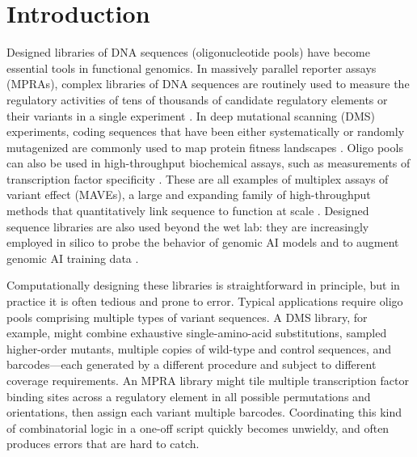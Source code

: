 \documentclass[twoside]{kinneylab_preprintstyle}
\begin{document}
\maketitle

\section*{Introduction}

Designed libraries of DNA sequences (oligonucleotide pools) have become essential tools in functional genomics. In massively parallel reporter assays (MPRAs), complex libraries of DNA sequences are routinely used to measure the regulatory activities of tens of thousands of candidate regulatory elements or their variants in a single experiment \citep{Patwardhan2009cw, Kinney2010tn, Melnikov2012dw, Kwasnieski2012hu, Sharon2012io, Mogno2013cf, Levo2014hl, Inoue2015cs, Vvedenskaya2015ih, Urtecho2018hu, Klein2020, Romero2023, LaFleur2024aa}. In deep mutational scanning (DMS) experiments, coding sequences that have been either systematically or randomly mutagenized are commonly used to map protein fitness landscapes \citep{Fowler2010gt, Hietpas2011bp, Fowler2014gq, Olson2014iq, Adams2016dka, Findlay2018kd, Starr2020aa}. Oligo pools can also be used in high-throughput biochemical assays, such as measurements of transcription factor specificity \citep{Berger2006wp, Maerkl2007tv, Noyes2008vr, Gordan2013, Le2018cr, Shen2018ip, Khetan2025_paditseq}. These are all examples of multiplex assays of variant effect (MAVEs), a large and expanding family of high-throughput methods that quantitatively link sequence to function at scale \citep{Kinney2019jc, Starita2017ec, Weile2018gm}. Designed sequence libraries are also used beyond the wet lab: they are increasingly employed in silico to probe the behavior of genomic AI models \citep{Avsec2021bpnet, Toneyan2024creme, Seitz2024squid, Seitz2025, Nagai2026review} and to augment genomic AI training data \citep{Lee2023}.

Computationally designing these libraries is straightforward in principle, but in practice it is often tedious and prone to error. Typical applications require oligo pools comprising multiple types of variant sequences. A DMS library, for example, might combine exhaustive single-amino-acid substitutions, sampled higher-order mutants, multiple copies of wild-type and control sequences, and barcodes---each generated by a different procedure and subject to different coverage requirements. An MPRA library might tile multiple transcription factor binding sites across a regulatory element in all possible permutations and orientations, then assign each variant multiple barcodes. Coordinating this kind of combinatorial logic in a one-off script quickly becomes unwieldy, and often produces errors that are hard to catch.
\end{document}
